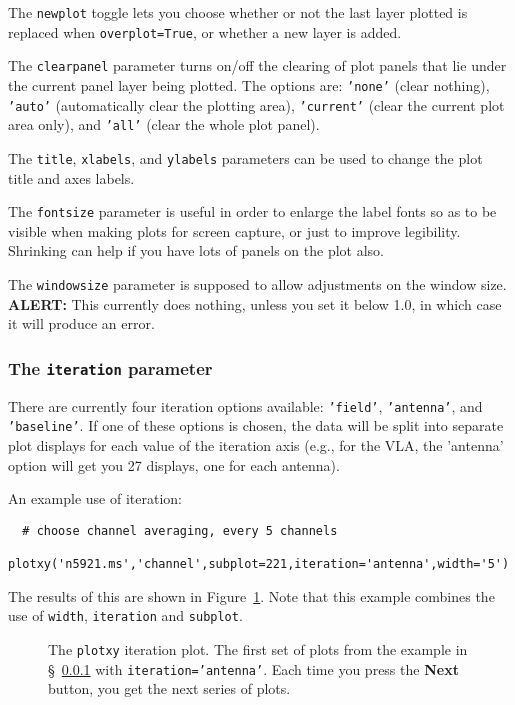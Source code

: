 The {\tt newplot} toggle lets you choose whether or not the
last layer plotted is replaced when {\tt overplot=True}, or whether
a new layer is added.

The {\tt clearpanel} parameter turns on/off the clearing of plot panels
that lie under the current panel layer being plotted. The options are:
{\tt 'none'} (clear nothing), {\tt 'auto'} (automatically clear the
plotting area), {\tt 'current'} (clear the current plot area only), 
and {\tt 'all'} (clear the whole plot panel).

The {\tt title}, {\tt xlabels}, and {\tt ylabels} parameters can
be used to change the plot title and axes labels.

The {\tt fontsize} parameter is useful in order to enlarge the label
fonts so as to be visible when making plots for screen capture, or
just to improve legibility.  Shrinking can help if you have lots of
panels on the plot also.

The {\tt windowsize} parameter is supposed to allow adjustments on
the window size. {\bf ALERT:} This currently does nothing,
unless you set it below 1.0, in which case it will produce an 
error.

\subsubsection{ The {\tt iteration} parameter}
\label{section:edit.plot.plotxy.iter}

There are currently four iteration options available:
{\tt 'field'}, {\tt 'antenna'}, and {\tt 'baseline'}.  
If one of these options
is chosen, the data will be split into separate plot displays for each
value of the iteration axis (e.g., for the VLA, the 'antenna' option
will get you 27 displays, one for each antenna).  

An example use of iteration:
\small
\begin{verbatim}
  # choose channel averaging, every 5 channels
  plotxy('n5921.ms','channel',subplot=221,iteration='antenna',width='5')
\end{verbatim}
\normalsize
The results of this are shown in Figure~\ref{fig:plotiter}.  Note
that this example combines the use of {\tt width}, {\tt iteration}
and {\tt subplot}.

\begin{figure}[h!]
\begin{center}
\caption{\label{fig:plotiter} The {\tt plotxy} iteration plot.
  The first set of plots from the example in
  \S~\ref{section:edit.plot.plotxy.iter} with {\tt iteration='antenna'}.
  Each time you press the {\bf Next} button, you
  get the next series of plots.} 
\hrulefill
\end{center}
\end{figure}

